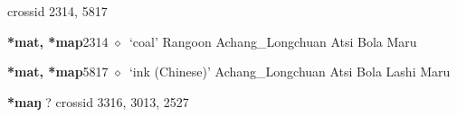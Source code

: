   {\tiny crossid 2314, 5817}
  \begin{list}{}{\leftmargin=1.5em \itemindent=-1.5em}
  \item {\footnotesize \textbf{*mat, *map}}{\tiny 2314}
         $\diamond$~`coal'
         Rangoon 
\hspace{1ex}
         Achang\_Longchuan 
\hspace{1ex}
         Atsi 
\hspace{1ex}
         Bola 
\hspace{1ex}
         Maru 
  \item {\footnotesize \textbf{*mat, *map}}{\tiny 5817}
\hspace{1ex}
         $\diamond$~`ink (Chinese)'
         Achang\_Longchuan 
\hspace{1ex}
         Atsi 
\hspace{1ex}
         Bola 
\hspace{1ex}
         Lashi 
\hspace{1ex}
         Maru 
  \end{list}
\item
\textbf{*maŋ}
?
  {\tiny crossid 3316, 3013, 2527}

